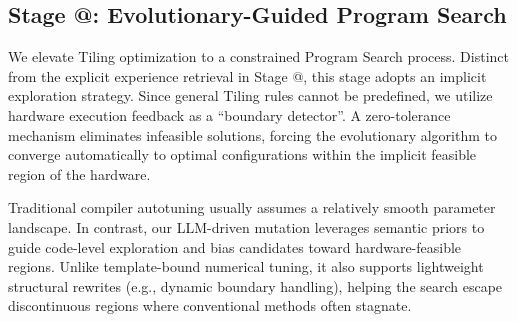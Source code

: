 \documentclass{article}
\makeatletter
\theoremstyle{plain}
\theoremstyle{definition}
\theoremstyle{remark}
\newcommand{\Rmnum}[1]{\expandafter\@slowromancap\romannumeral #1@}
\makeatother
\begin{document}
\subsection{Stage \Rmnum{1}: Evolutionary-Guided Program Search}

We elevate Tiling optimization to a constrained Program Search process. Distinct from the explicit experience retrieval in Stage \Rmnum{2}, this stage adopts an implicit exploration strategy. Since general Tiling rules cannot be predefined, we utilize hardware execution feedback as a ``boundary detector''. A zero-tolerance mechanism eliminates infeasible solutions, forcing the evolutionary algorithm to converge automatically to optimal configurations within the implicit feasible region of the hardware.

Traditional compiler autotuning usually assumes a relatively smooth parameter landscape. In contrast, our LLM-driven mutation leverages semantic priors to guide code-level exploration and bias candidates toward hardware-feasible regions. Unlike template-bound numerical tuning, it also supports lightweight structural rewrites (e.g., dynamic boundary handling), helping the search escape discontinuous regions where conventional methods often stagnate.
\end{document}
